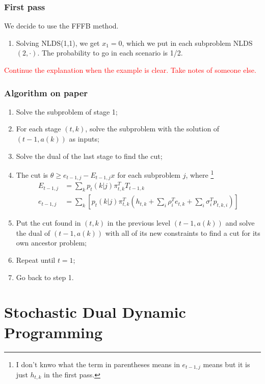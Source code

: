 \documentclass[12pt, openany]{report}
\theoremstyle{definition}
\begin{document}
\subsection{First pass}
We decide to use the FFFB method. 
\begin{enumerate}
	\item Solving NLDS(1,1), we get $x_1=0$, which we put in each subproblem NLDS$(2,\cdot)$. The probability to go in each scenario is 1/2. 
\end{enumerate}
\textcolor{red}{Continue the explanation when the example is clear. Take notes of someone else.}
\subsection{Algorithm on paper}
\begin{enumerate}
	\item Solve the subproblem of stage 1;
	\item For each stage $(t,k)$, solve the subproblem with the solution of $(t-1, a(k))$ as inputs;
	\item Solve the dual of the last stage to find the cut;
	\item The cut is $\theta \ge e_{t-1,j}-E_{t-1,j}x$ for each subproblem $j$, where \footnote{I don't knwo what the term in parentheses means in $e_{t-1,j}$ means but it is just $h_{t,k}$ in the first pass.}
	\begin{equation}
		\begin{aligned}
			E_{t-1,j} &= \sum_k p_t(k|j)\pi_{t,k}^T T_{t-1,k}\\
			e_{t-1,j} &= \sum_k \left[p_t(k|j)\pi_{t,k}^T \left(h_{t,k}+\sum_i \rho_i^T e_{t,k} + \sum_i \sigma_i^T p_{t,k,i}\right)\right]
		\end{aligned}
	\end{equation}
	\item Put the cut found in $(t,k)$ in the previous level $(t-1,a(k))$ and solve the dual of $(t-1,a(k))$ with all of its new constraints to find a cut for its own ancestor problem;
	\item Repeat until $t=1$;
	\item Go back to step 1.
\end{enumerate}
\chapter{Stochastic Dual Dynamic Programming}
\end{document}
